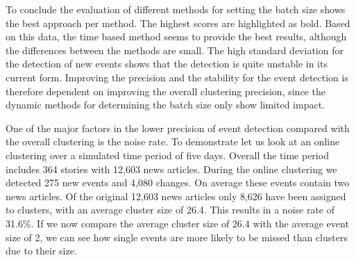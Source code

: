 To conclude the evaluation of different methods for setting the batch size 
shows the best approach per method.
The highest scores are highlighted as bold.
Based on this data, the time based method seems to provide the best results,
although the differences between the methods are small.
The high standard deviation for the detection of new events shows
that the detection is quite unstable in its current form.
Improving the precision and the stability for the event detection
is therefore dependent on improving the overall clustering precision,
since the dynamic methods for determining the batch size only show limited impact.

\begin{table}[h]
    \centering
    \caption{Final scores obtained by each method for setting the batch size.}
    \label{tab:batch_size_methods}
\end{table}

One of the major factors in the lower precision of event detection
compared with the overall clustering is the noise rate.
To demonstrate let us look at an online clustering over a simulated time period of five days.
Overall the time period includes 364 stories with 12,603 news articles.
During the online clustering we detected 275 new events and 4,080 changes.
On average these events contain two news articles.
Of the original 12,603 news articles only 8,626 have been assigned to clusters,
with an average cluster size of 26.4.
This results in a noise rate of 31.6\%.
If we now compare the average cluster size of 26.4 with the average event size of 2,
we can see how single events are more likely to be missed than clusters due to their size.

